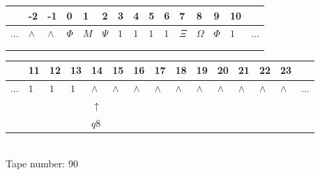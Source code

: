 \documentclass[11pt]{article}
\begin{document}
\begin{table}[H]
\centering
\begin{tabular}{lllllllllllllll}
 & -2 & -1 & 0 & 1 & 2 & 3 & 4 & 5 & 6 & 7 & 8 & 9 & 10 & \\
\hline
$...$ & \multicolumn{1}{|l|}{$\wedge$} & \multicolumn{1}{|l|}{$\wedge$} & \multicolumn{1}{|l|}{$\Phi$} & \multicolumn{1}{|l|}{$M$} & \multicolumn{1}{|l|}{$\Psi$} & \multicolumn{1}{|l|}{$1$} & \multicolumn{1}{|l|}{$1$} & \multicolumn{1}{|l|}{$1$} & \multicolumn{1}{|l|}{$1$} & \multicolumn{1}{|l|}{$\Xi$} & \multicolumn{1}{|l|}{$\Omega$} & \multicolumn{1}{|l|}{$\Phi$} & \multicolumn{1}{|l|}{$1$} & $...$\\
\hline
&  &  &  &  &  &  &  &  &  &  &  &  &  &  \\
&  &  &  &  &  &  &  &  &  &  &  &  &  &  \\
\end{tabular}
\begin{tabular}{lllllllllllllll}
 & 11 & 12 & 13 & 14 & 15 & 16 & 17 & 18 & 19 & 20 & 21 & 22 & 23 & \\
\hline
$...$ & \multicolumn{1}{|l|}{$1$} & \multicolumn{1}{|l|}{$1$} & \multicolumn{1}{|l|}{$1$} & \multicolumn{1}{|l|}{$\wedge$} & \multicolumn{1}{|l|}{$\wedge$} & \multicolumn{1}{|l|}{$\wedge$} & \multicolumn{1}{|l|}{$\wedge$} & \multicolumn{1}{|l|}{$\wedge$} & \multicolumn{1}{|l|}{$\wedge$} & \multicolumn{1}{|l|}{$\wedge$} & \multicolumn{1}{|l|}{$\wedge$} & \multicolumn{1}{|l|}{$\wedge$} & \multicolumn{1}{|l|}{$\wedge$} & $...$\\
\hline
&  &  &  & $\uparrow$ &  &  &  &  &  &  &  &  &  &  \\
&  &  &  & $ q8 $ &  &  &  &  &  &  &  &  &  &  \\
\end{tabular}
\\
Tape number: 90
\noindent\makebox[\linewidth]{\hdashrule{\textwidth}{1pt}{1pt}}\end{table}
\end{document}
